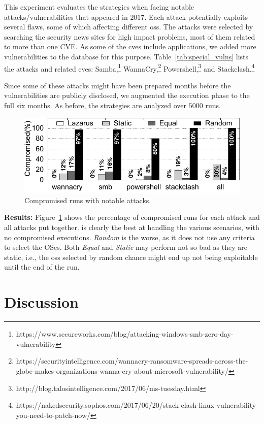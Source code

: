 This experiment evaluates the strategies when facing notable attacks/vulnerabilities that appeared in $2017$. 
Each attack potentially exploits several flaws, some of which affecting different \glspl{os}. 
The attacks were selected by searching the security news sites for high impact problems, most of them related to more than one CVE. 
As some of the \glspl{cve} include applications, we added more vulnerabilities to the database for this purpose.
Table~\ref{tab:special_vulns} lists the attacks and related \glspl{cve}: Samba,\footnote{https://www.secureworks.com/blog/attacking-windows-smb-zero-day-vulnerability} WannaCry,\footnote{https://securityintelligence.com/wannacry-ransomware-spreads-across-the-globe-makes-organizations-wanna-cry-about-microsoft-vulnerability/} Powershell,\footnote{http://blog.talosintelligence.com/2017/06/ms-tuesday.html} and Stackclash.\footnote{https://nakedsecurity.sophos.com/2017/06/20/stack-clash-linux-vulnerability-you-need-to-patch-now/}


Since some of these attacks might have been prepared months before the vulnerabilities are publicly disclosed, we augmented the execution phase to the full six months. 
As before, the strategies are analyzed over $5000$ runs.


\begin{figure}[t]
\begin{center}
\includegraphics[width=\columnwidth]{images/gnuplot/special_vulns/execution-special.pdf}
\caption{Compromised runs with notable attacks.}
\label{fig:special_vulns}
\end{center}
\end{figure}

\textbf{Results:}
Figure~\ref{fig:special_vulns} shows the percentage of compromised runs for each attack and all attacks put together.
\system is clearly the best at handling the various scenarios, with no compromised executions.
\emph{Random} is the worse, as it does not use any criteria to select the OSes. 
Both \emph{Equal} and \emph{Static} may perform not so bad as they are static, i.e., the \glspl{os} selected by random chance might end up not being exploitable until the end of the run.


\section{Discussion}
\label{sec:discussionlazarus}
